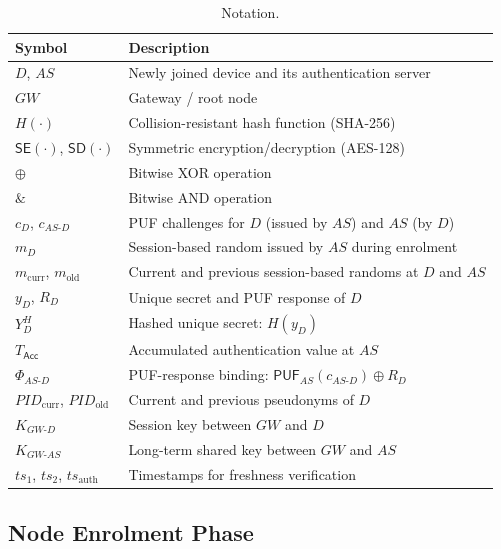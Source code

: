 \documentclass[conference]{IEEEtran}
\begin{document}
\begin{table}[!t]
  \centering
  \caption{Notation.}
  \label{tab:notations}
  \scriptsize
  \setlength{\tabcolsep}{4pt}
  \begin{tabular}{ll}
    \toprule
    Symbol & Description \\
    \midrule
    $D$, $AS$ & Newly joined device and its authentication server \\
    $GW$ & Gateway / root node \\
    $H(\cdot)$ & Collision-resistant hash function (SHA-256) \\
    $\mathsf{SE}(\cdot)$, $\mathsf{SD}(\cdot)$ & Symmetric encryption/decryption (AES-128) \\
    $\oplus$ & Bitwise XOR operation \\
    $\mathbin{\&}$ & Bitwise AND operation \\
    $c_D$, $c_{AS\text{-}D}$ & PUF challenges for $D$ (issued by $AS$) and $AS$ (by $D$) \\
    $m_D$ & Session-based random issued by $AS$ during enrolment \\
    $m_{\mathrm{curr}}$, $m_{\mathrm{old}}$ & Current and previous session-based randoms at $D$ and $AS$ \\
    $y_D$, $R_D$ & Unique secret and PUF response of $D$ \\
    $Y_D^H$ & Hashed unique secret: $H(y_D)$ \\
    $T_\mathsf{Acc}$ & Accumulated authentication value at $AS$ \\
    $\Phi_{AS\text{-}D}$ & PUF-response binding: $\mathsf{PUF}_{AS}(c_{AS\text{-}D}) \oplus R_D$ \\
    $\mathit{PID}_{\mathrm{curr}}$, $\mathit{PID}_{\mathrm{old}}$ & Current and previous pseudonyms of $D$ \\
    $K_{GW\text{-}D}$ & Session key between $GW$ and $D$ \\
    $K_{GW\text{-}AS}$ & Long-term shared key between $GW$ and $AS$ \\
    $ts_1$, $ts_2$, $ts_{\mathrm{auth}}$ & Timestamps for freshness verification \\
    \bottomrule
  \end{tabular}
\end{table}

\subsection{Node Enrolment Phase}
\end{document}
